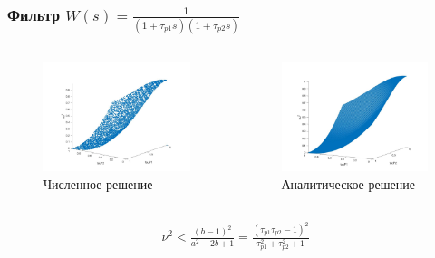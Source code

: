 \documentclass{beamer}
\begin{document}
\begin{frame}
\frametitle{Фильтр $W(s) = \frac{1}{(1+\tau_{p1}s)(1+\tau_{p2}s)}$}
\begin{columns}[onlytextwidth]
\begin{column}{.45\textwidth}
\begin{figure}
  \includegraphics[width=\textwidth]{images/filter1e.jpg}
  \caption{Численное решение}
\end{figure}
\end{column}
\hfill
\begin{column}{.45\textwidth}
\begin{figure}
  \includegraphics[width=\textwidth]{images/filter1_1.jpg}
  \caption{Аналитическое решение}
\end{figure}
\end{column}
\end{columns}
\begin{equation}\label{filter1_max}
 \begin{aligned}
\nu^2 < \frac{(b - 1)^2}{a^2 - 2b + 1} = \frac{(\tau_{p1}\tau_{p2} - 1)^2}{\tau_{p1}^2 + \tau_{p2}^2 + 1}
 \end{aligned}
\end{equation} 
\end{frame}
\end{document}
